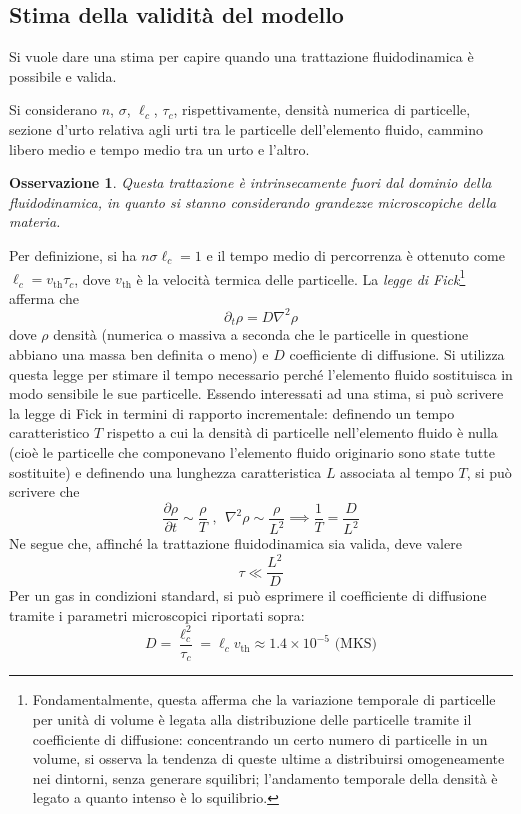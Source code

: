 \documentclass[11pt, a4paper]{scrartcl}
\theoremstyle{style}
\newtheorem{osservazione}{Osservazione}[section]
\theoremstyle{style1}
\numberwithin{equation}{subsection}
\begin{document}
\subsection{Stima della validit\`a del modello}

Si vuole dare una stima per capire quando una trattazione fluidodinamica \`e possibile e valida.

Si considerano $n$, $\sigma $, $\ell _c$, $\tau _c$, rispettivamente, densit\`a numerica di particelle, sezione d'urto relativa agli urti tra le particelle dell'elemento fluido, cammino libero medio e tempo medio tra un urto e l'altro.
\begin{osservazione}
Questa trattazione \`e intrinsecamente fuori dal dominio della fluidodinamica, in quanto si stanno considerando grandezze microscopiche della materia.
\end{osservazione}
\noindent Per definizione, si ha $n\sigma \ell _c = 1 $ e il tempo medio di percorrenza \`e ottenuto come $\ell _c = v_\text{th} \tau _c$, dove $v_\text{th}$ \`e la velocit\`a termica delle particelle.
La \textit{legge di Fick}\footnote{Fondamentalmente, questa afferma che la variazione temporale di particelle per unit\`a di volume \`e legata alla distribuzione delle particelle tramite il coefficiente di diffusione: concentrando un certo numero di particelle in un volume, si osserva la tendenza di queste ultime a distribuirsi omogeneamente nei dintorni, senza generare squilibri; l'andamento temporale della densit\`a \`e legato a quanto intenso \`e lo squilibrio.} afferma che
\[ 
\partial _t \rho = D \nabla ^2 \rho 
\] 
dove $\rho $ densit\`a (numerica o massiva a seconda che le particelle in questione abbiano una massa ben definita o meno) e $D$ coefficiente di diffusione.
Si utilizza questa legge per stimare il tempo necessario perch\'e l'elemento fluido sostituisca in modo sensibile le sue particelle.
Essendo interessati ad una stima, si pu\`o scrivere la legge di Fick in termini di rapporto incrementale: definendo un tempo caratteristico $T$ rispetto a cui la densit\`a di particelle nell'elemento fluido \`e nulla (cio\`e le particelle che componevano l'elemento fluido originario sono state tutte sostituite) e definendo una lunghezza caratteristica $L $ associata al tempo $T$, si pu\`o scrivere che
\[
\frac{\partial \rho }{\partial t} \sim \frac{\rho }{T}\, \, , \ \ \nabla ^2 \rho \sim \frac{\rho }{L^2}\implies \frac{1}{T} = \frac{D}{L ^2}
\] 
Ne segue che, affinch\'e la trattazione fluidodinamica sia valida, deve valere 
\begin{equation}
	\tau \ll \frac{L^2}{D}
\end{equation}
Per un gas in condizioni standard, si pu\`o esprimere il coefficiente di diffusione tramite i parametri microscopici riportati sopra:
\[
D = \frac{\ell_c ^2}{\tau _c} = \ell _c v_{\text{th}} \approx 1.4 \times 10^{-5} \text{ (MKS)}
\] 
\end{document}
